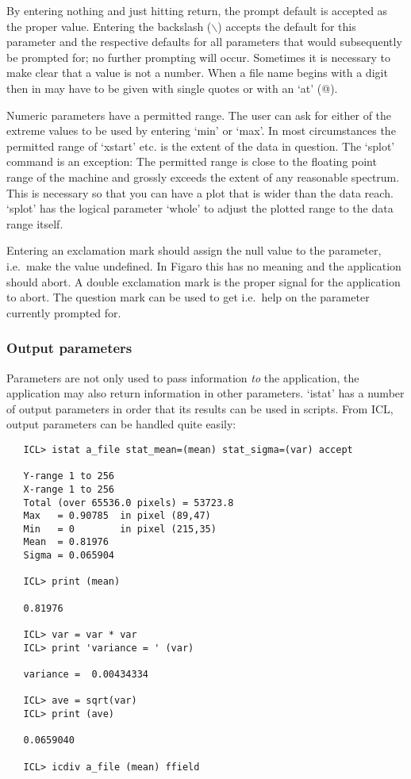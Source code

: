    By entering nothing and just hitting return, the prompt default is
   accepted as the proper value. Entering the backslash ($\backslash$)
   accepts the default for this parameter and the respective defaults
   for all parameters that would subsequently be prompted for; no
   further prompting will occur. Sometimes it is necessary to make clear
   that a value is not a number. When a file name begins with a digit
   then in may have to be given with single quotes or with an `at' (@).

   Numeric parameters have a permitted range. The user can ask for
   either of the extreme values to be used by entering `min' or
   `max'. In most circumstances the permitted range of `xstart' etc. is
   the extent of the data in question. The `splot' command is an
   exception: The permitted range is close to the floating point range
   of the machine and grossly exceeds the extent of any reasonable
   spectrum. This is necessary so that you can have a plot that is wider
   than the data reach. `splot' has the logical parameter `whole' to
   adjust the plotted range to the data range itself.

   Entering an exclamation mark should assign the null value to the
   parameter, i.e.\ make the value undefined. In Figaro this has no
   meaning and the application should abort. A double exclamation mark
   is the proper signal for the application to abort. The question mark
   can be used to get
   i.e.\ help on the parameter currently prompted for.


\subsubsection{\label{paramsoutput}Output parameters}

   Parameters are not only used to pass information {\em to\/}
   the application, the application may also return information in other
   parameters. `istat' has a number of output parameters in order that
   its results can be used in scripts. From ICL, output parameters can be
   handled quite easily:

\begin{verbatim}
   ICL> istat a_file stat_mean=(mean) stat_sigma=(var) accept

   Y-range 1 to 256
   X-range 1 to 256
   Total (over 65536.0 pixels) = 53723.8
   Max   = 0.90785  in pixel (89,47)
   Min   = 0        in pixel (215,35)
   Mean  = 0.81976
   Sigma = 0.065904

   ICL> print (mean)

   0.81976

   ICL> var = var * var
   ICL> print 'variance = ' (var)

   variance =  0.00434334

   ICL> ave = sqrt(var)
   ICL> print (ave)

   0.0659040

   ICL> icdiv a_file (mean) ffield
\end{verbatim}

